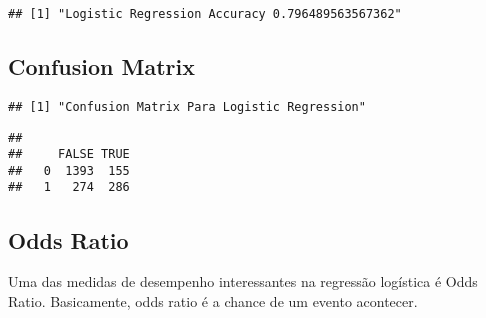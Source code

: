 \documentclass[]{article}
\begin{document}
\begin{verbatim}
## [1] "Logistic Regression Accuracy 0.796489563567362"
\end{verbatim}

\hypertarget{confusion-matrix}{%
\subsection{Confusion Matrix}\label{confusion-matrix}}

\begin{verbatim}
## [1] "Confusion Matrix Para Logistic Regression"
\end{verbatim}

\begin{verbatim}
##    
##     FALSE TRUE
##   0  1393  155
##   1   274  286
\end{verbatim}

\hypertarget{odds-ratio}{%
\subsection{Odds Ratio}\label{odds-ratio}}

Uma das medidas de desempenho interessantes na regressão logística é
Odds Ratio. Basicamente, odds ratio é a chance de um evento acontecer.
\end{document}
